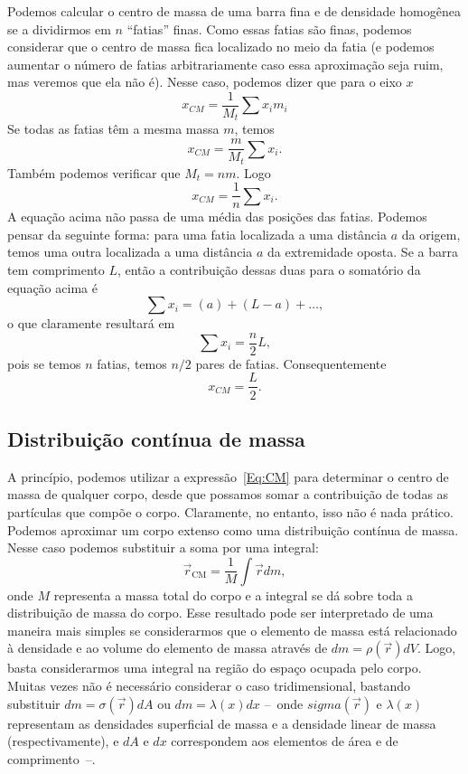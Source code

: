Podemos calcular o centro de massa de uma barra fina e de densidade homogênea se a dividirmos em $n$ ``fatias'' finas. Como essas fatias são finas, podemos considerar que o centro de massa fica localizado no meio da fatia (e podemos aumentar o número de fatias arbitrariamente caso essa aproximação seja ruim, mas veremos que ela não é). Nesse caso, podemos dizer que para o eixo $x$
\begin{equation}
  x_{CM} = \frac{1}{M_t} \sum x_i m_i
\end{equation}
%
Se todas as fatias têm a mesma massa $m$, temos
\begin{equation}
  x_{CM} = \frac{m}{M_t} \sum x_i.
\end{equation}
%
Também podemos verificar que $M_t = n m$. Logo
\begin{equation}
  x_{CM} = \frac{1}{n} \sum x_i.
\end{equation}
%
A equação acima não passa de uma média das posições das fatias. Podemos pensar da seguinte forma: para uma fatia localizada a uma distância $a$ da origem, temos uma outra localizada a uma distância $a$ da extremidade oposta. Se a barra tem comprimento $L$, então a contribuição dessas duas para o somatório da equação acima é
\begin{equation}
  \sum x_i = (a) + (L - a) + \dots,
\end{equation}
%
o que claramente resultará em
\begin{equation}
  \sum x_i = \frac{n}{2}L,
\end{equation}
%
pois se temos $n$ fatias, temos $n/2$ pares de fatias. Consequentemente
\begin{equation}
  x_{CM} = \frac{L}{2}.
\end{equation}

\subsection{Distribuição contínua de massa}

A princípio, podemos utilizar a expressão~\eqref{Eq:CM} para determinar o centro de massa de qualquer corpo, desde que possamos somar a contribuição de todas as partículas que compõe o corpo. Claramente, no entanto, isso não é nada prático. Podemos aproximar um corpo extenso como uma distribuição contínua de massa. Nesse caso podemos substituir a soma por uma integral:
\begin{equation}
  \vec{r}_{\textrm{CM}} = \frac{1}{M} \int \vec{r} dm,
\end{equation}
%
onde $M$ representa a massa total do corpo e a integral se dá sobre toda a distribuição de massa do corpo. Esse resultado pode ser interpretado de uma maneira mais simples se considerarmos que o elemento de massa está relacionado à densidade e ao volume do elemento de massa através de $dm = \rho(\vec{r}) dV$. Logo, basta considerarmos uma integral na região do espaço ocupada pelo corpo. Muitas vezes não é necessário considerar o caso tridimensional, bastando substituir $dm = \sigma(\vec{r}) dA$ ou $dm = \lambda(x) dx$ --~onde $sigma(\vec{r})$ e $\lambda(x)$ representam as densidades superficial de massa e a densidade linear de massa (respectivamente), e $dA$ e $dx$ correspondem aos elementos de área e de comprimento~--.

